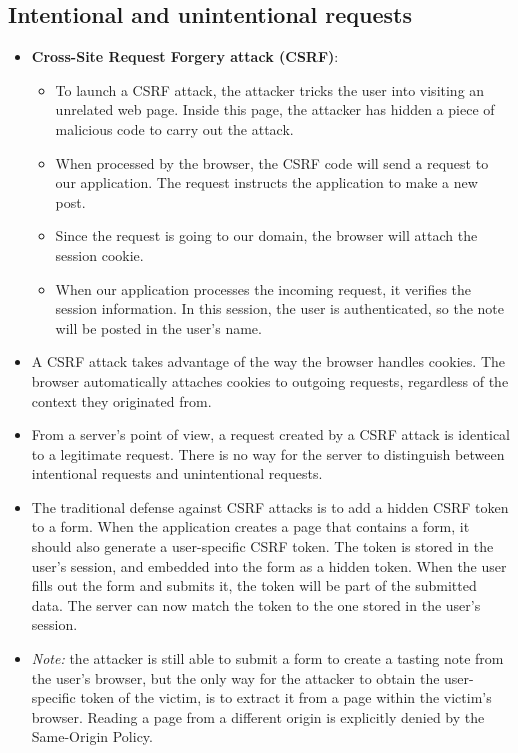 \documentclass[../main.tex]{subfiles}
\begin{document}
\subsection{Intentional and unintentional requests}
\begin{itemize}
\item \textbf{Cross-Site Request Forgery attack (CSRF)}:
\begin{itemize}
\item To launch a CSRF attack, the attacker tricks the user into visiting an unrelated web page. Inside this page, the attacker has hidden a piece of malicious code to carry out the attack.
\item When processed by the browser, the CSRF code will send a request to our application. The request instructs the application to make a new post.
\item Since the request is going to our domain, the browser will attach the session cookie.
\item When our application processes the incoming request, it verifies the session information. In this session, the user is authenticated, so the note will be posted in the user’s name.
\end{itemize}
\item A CSRF attack takes advantage of the way the browser handles cookies. The browser automatically attaches cookies to outgoing requests, regardless of the context they originated from.
\item From a server’s point of view, a request created by a CSRF attack is identical to a legitimate request. There is no way for the server to distinguish between intentional requests and unintentional requests.
\item The traditional defense against CSRF attacks is to add a hidden CSRF token to a form. When the application creates a page that contains a form, it should also generate a user-specific CSRF token. The token is stored in the user’s session, and embedded into the form as a hidden token. When the user fills out the form and submits it, the token will be part of the submitted data. The server can now match the token to the one stored in the user’s session.
\item \emph{Note:} the attacker is still able to submit a form to create a tasting note from the user’s browser, but the only way for the attacker to obtain the user-specific token of the victim, is to extract it from a page within the victim’s browser. Reading a page from a different origin is explicitly denied by the Same-Origin Policy.

\end{itemize}
\end{document}
